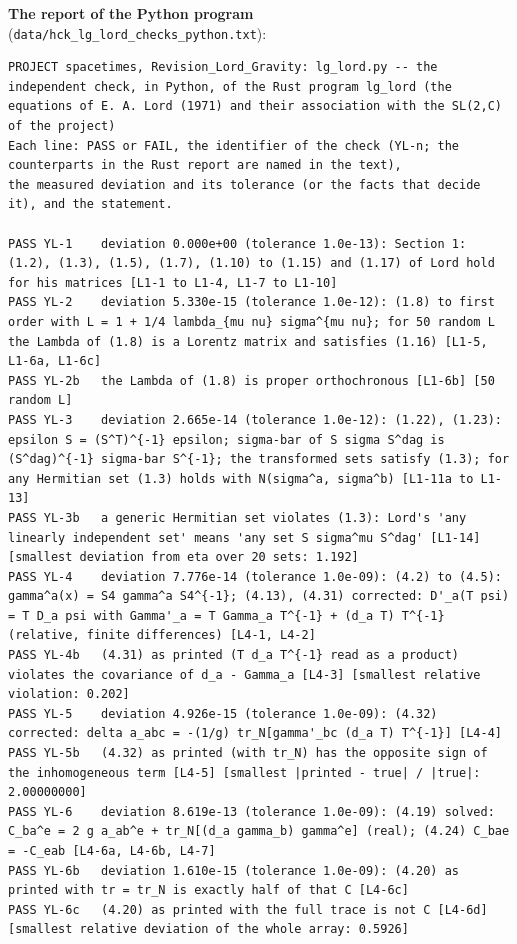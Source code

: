 \documentclass[
  10pt,
]{article}
\begin{document}
\textbf{The report of the Python program}
(\texttt{data/hck\_lg\_lord\_checks\_python.txt}):

\begin{verbatim}
PROJECT spacetimes, Revision_Lord_Gravity: lg_lord.py -- the independent check, in Python, of the Rust program lg_lord (the equations of E. A. Lord (1971) and their association with the SL(2,C) of the project)
Each line: PASS or FAIL, the identifier of the check (YL-n; the counterparts in the Rust report are named in the text),
the measured deviation and its tolerance (or the facts that decide it), and the statement.

PASS YL-1    deviation 0.000e+00 (tolerance 1.0e-13): Section 1: (1.2), (1.3), (1.5), (1.7), (1.10) to (1.15) and (1.17) of Lord hold for his matrices [L1-1 to L1-4, L1-7 to L1-10]
PASS YL-2    deviation 5.330e-15 (tolerance 1.0e-12): (1.8) to first order with L = 1 + 1/4 lambda_{mu nu} sigma^{mu nu}; for 50 random L the Lambda of (1.8) is a Lorentz matrix and satisfies (1.16) [L1-5, L1-6a, L1-6c]
PASS YL-2b   the Lambda of (1.8) is proper orthochronous [L1-6b] [50 random L]
PASS YL-3    deviation 2.665e-14 (tolerance 1.0e-12): (1.22), (1.23): epsilon S = (S^T)^{-1} epsilon; sigma-bar of S sigma S^dag is (S^dag)^{-1} sigma-bar S^{-1}; the transformed sets satisfy (1.3); for any Hermitian set (1.3) holds with N(sigma^a, sigma^b) [L1-11a to L1-13]
PASS YL-3b   a generic Hermitian set violates (1.3): Lord's 'any linearly independent set' means 'any set S sigma^mu S^dag' [L1-14] [smallest deviation from eta over 20 sets: 1.192]
PASS YL-4    deviation 7.776e-14 (tolerance 1.0e-09): (4.2) to (4.5): gamma^a(x) = S4 gamma^a S4^{-1}; (4.13), (4.31) corrected: D'_a(T psi) = T D_a psi with Gamma'_a = T Gamma_a T^{-1} + (d_a T) T^{-1} (relative, finite differences) [L4-1, L4-2]
PASS YL-4b   (4.31) as printed (T d_a T^{-1} read as a product) violates the covariance of d_a - Gamma_a [L4-3] [smallest relative violation: 0.202]
PASS YL-5    deviation 4.926e-15 (tolerance 1.0e-09): (4.32) corrected: delta a_abc = -(1/g) tr_N[gamma'_bc (d_a T) T^{-1}] [L4-4]
PASS YL-5b   (4.32) as printed (with tr_N) has the opposite sign of the inhomogeneous term [L4-5] [smallest |printed - true| / |true|: 2.00000000]
PASS YL-6    deviation 8.619e-13 (tolerance 1.0e-09): (4.19) solved: C_ba^e = 2 g a_ab^e + tr_N[(d_a gamma_b) gamma^e] (real); (4.24) C_bae = -C_eab [L4-6a, L4-6b, L4-7]
PASS YL-6b   deviation 1.610e-15 (tolerance 1.0e-09): (4.20) as printed with tr = tr_N is exactly half of that C [L4-6c]
PASS YL-6c   (4.20) as printed with the full trace is not C [L4-6d] [smallest relative deviation of the whole array: 0.5926]

\end{verbatim}
\end{document}
